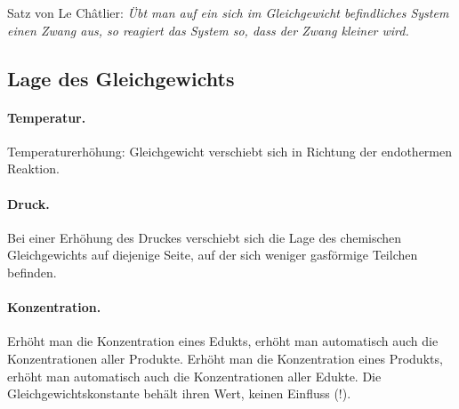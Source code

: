 Satz von Le Châtlier:
\textit{Übt man auf ein sich im Gleichgewicht befindliches System einen Zwang aus, so reagiert das System so, dass der Zwang kleiner wird.}

\subsection{Lage des Gleichgewichts}

\paragraph{Temperatur.} Temperaturerhöhung: Gleichgewicht verschiebt sich in Richtung der endothermen Reaktion.

\paragraph{Druck.} Bei einer Erhöhung des Druckes verschiebt sich die Lage des chemischen Gleichgewichts auf diejenige Seite, auf der sich weniger gasförmige Teilchen befinden.

\paragraph{Konzentration.} Erhöht man die Konzentration eines Edukts, erhöht man automatisch auch die Konzentrationen aller Produkte. Erhöht man die Konzentration eines Produkts, erhöht man automatisch auch die Konzentrationen aller Edukte. Die Gleichgewichtskonstante behält ihren Wert, keinen Einfluss (!).

